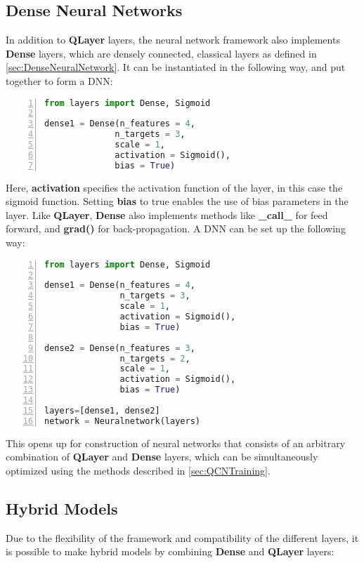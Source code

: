 \subsection{Dense Neural Networks}\label{sec:DNNs}
In addition to \textbf{QLayer} layers, the neural network framework also implements \textbf{Dense} layers, which are densely connected, classical layers as defined in \autoref{sec:DenseNeuralNetwork}. It can be instantiated in the following way, and put together to form a DNN:

\begin{lstlisting}[language=python, numbers=left]
from layers import Dense, Sigmoid

dense1 = Dense(n_features = 4,
              n_targets = 3,
              scale = 1,
              activation = Sigmoid(),
              bias = True)
\end{lstlisting}
Here, \textbf{activation} specifies the activation function of the layer, in this case the sigmoid function. Setting \textbf{bias} to true enables the use of bias parameters in the layer. Like \textbf{QLayer}, \textbf{Dense} also implements methods like \textbf{\_call\_} for feed forward, and \textbf{grad()} for back-propagation. A DNN can be set up the following way:

\begin{lstlisting}[language=python, numbers=left]
from layers import Dense, Sigmoid

dense1 = Dense(n_features = 4,
               n_targets = 3,
               scale = 1,
               activation = Sigmoid(),
               bias = True)
               
dense2 = Dense(n_features = 3,
               n_targets = 2,
               scale = 1,
               activation = Sigmoid(),
               bias = True)
               
layers=[dense1, dense2]       
network = Neuralnetwork(layers)
\end{lstlisting}

This opens up for construction of neural networks that consists of an arbitrary combination of \textbf{QLayer} and \textbf{Dense} layers, which can be simultaneously optimized using the methods described in \autoref{sec:QCNTraining}.

\subsection{Hybrid Models}\label{sec:Hybrid Models}
Due to the flexibility of the framework and compatibility of the different layers, it is possible to make hybrid models by combining \textbf{Dense} and \textbf{QLayer} layers:


